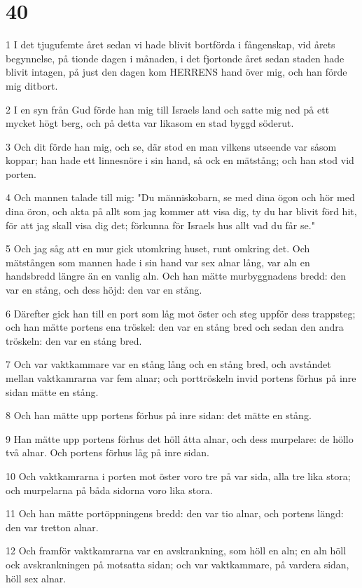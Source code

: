 \chapter{40}

\par 1 I det tjugufemte året sedan vi hade blivit bortförda i fångenskap, vid årets begynnelse, på tionde dagen i månaden, i det fjortonde året sedan staden hade blivit intagen, på just den dagen kom HERRENS hand över mig, och han förde mig ditbort.
\par 2 I en syn från Gud förde han mig till Israels land och satte mig ned på ett mycket högt berg, och på detta var likasom en stad byggd söderut.
\par 3 Och dit förde han mig, och se, där stod en man vilkens utseende var såsom koppar; han hade ett linnesnöre i sin hand, så ock en mätstång; och han stod vid porten.
\par 4 Och mannen talade till mig: "Du människobarn, se med dina ögon och hör med dina öron, och akta på allt som jag kommer att visa dig, ty du har blivit förd hit, för att jag skall visa dig det; förkunna för Israels hus allt vad du får se."
\par 5 Och jag såg att en mur gick utomkring huset, runt omkring det. Och mätstången som mannen hade i sin hand var sex alnar lång, var aln en handsbredd längre än en vanlig aln. Och han mätte murbyggnadens bredd: den var en stång, och dess höjd: den var en stång.
\par 6 Därefter gick han till en port som låg mot öster och steg uppför dess trappsteg; och han mätte portens ena tröskel: den var en stång bred och sedan den andra tröskeln: den var en stång bred.
\par 7 Och var vaktkammare var en stång lång och en stång bred, och avståndet mellan vaktkamrarna var fem alnar; och porttröskeln invid portens förhus på inre sidan mätte en stång.
\par 8 Och han mätte upp portens förhus på inre sidan: det mätte en stång.
\par 9 Han mätte upp portens förhus det höll åtta alnar, och dess murpelare: de höllo två alnar. Och portens förhus låg på inre sidan.
\par 10 Och vaktkamrarna i porten mot öster voro tre på var sida, alla tre lika stora; och murpelarna på båda sidorna voro lika stora.
\par 11 Och han mätte portöppningens bredd: den var tio alnar, och portens längd: den var tretton alnar.
\par 12 Och framför vaktkamrarna var en avskrankning, som höll en aln; en aln höll ock avskrankningen på motsatta sidan; och var vaktkammare, på vardera sidan, höll sex alnar.
